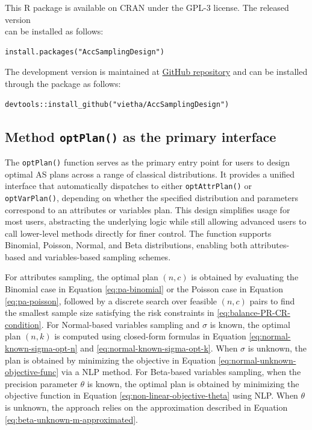 This R package is available on CRAN under the GPL-3 license. The released version\\
can be installed as follows:

\begin{verbatim}
install.packages("AccSamplingDesign")
\end{verbatim}

The development version is maintained at \href{https://github.com/vietha/AccSamplingDesign}{GitHub repository}
and can be installed through the  package \citep{wickham2022devtools} as follows:

\begin{verbatim}
devtools::install_github("vietha/AccSamplingDesign")
\end{verbatim}

\subsection{\texorpdfstring{Method \texttt{optPlan()} as the primary interface}{Method optPlan() as the primary interface}}\label{method-optplan-as-the-primary-interface}

The \texttt{optPlan()} function serves as the primary entry point for users to
design optimal AS plans across a range of classical distributions. It provides a
unified interface that automatically dispatches to either \texttt{optAttrPlan()}
or \texttt{optVarPlan()}, depending on whether the specified distribution and
parameters correspond to an attributes or variables plan.
This design simplifies usage for most users, abstracting the underlying logic
while still allowing advanced users to call lower-level methods directly for
finer control. The function supports Binomial, Poisson, Normal, and Beta
distributions, enabling both attributes-based and variables-based sampling schemes.

For attributes sampling, the optimal plan \((n, c)\) is obtained by evaluating the
Binomial case in Equation \eqref{eq:pa-binomial} or the Poisson case in Equation
\eqref{eq:pa-poisson}, followed by a discrete search over feasible
\((n, c)\) pairs to find the smallest sample size satisfying the risk
constraints in \eqref{eq:balance-PR-CR-condition}.
For Normal-based variables sampling and \(\sigma\) is known, the optimal plan
\((n, k)\) is computed using closed-form formulas in
Equation \eqref{eq:normal-known-sigma-opt-n} and
\eqref{eq:normal-known-sigma-opt-k}. When \(\sigma\) is unknown, the plan is
obtained by minimizing the objective in
Equation \eqref{eq:normal-unknown-objective-func} via a NLP method. For Beta-based
variables sampling, when the precision parameter \(\theta\) is known,
the optimal plan is obtained by minimizing the objective function in
Equation \eqref{eq:non-linear-objective-theta} using NLP. When \(\theta\) is
unknown, the approach relies on the approximation described in
Equation \eqref{eq:beta-unknown-m-approximated}.

